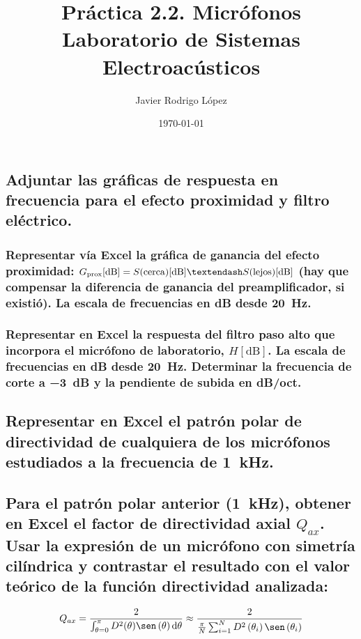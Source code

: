 \documentclass[10pt]{article}
\title{\Huge Práctica 2.2. Micrófonos \\\huge Laboratorio de Sistemas Electroacústicos}
\author{Javier Rodrigo López}
\date{\today}
\begin{document}
\maketitle
\setcounter{subsection}{3}

\subsection{Adjuntar las gráficas de respuesta en frecuencia para el efecto proximidad y filtro eléctrico.}
\subsubsection{Representar vía Excel la gráfica de ganancia del efecto proximidad: $G _{\textnormal{prox}} [\unit{\dB} ] = S(\text{cerca}) [\unit{\dB} ]  – S(\text{lejos}) [\unit{\dB} ] $ (hay que compensar la diferencia de ganancia del preamplificador, si existió). La escala de frecuencias en \unit{\dB} desde \qty{20}{\hertz }.}
\subsubsection{Representar en Excel la respuesta del filtro paso alto que incorpora el micrófono de laboratorio, $H [\unit{\dB} ] $. La escala de frecuencias en \unit{\dB} desde \qty{20}{\hertz }. Determinar la frecuencia de corte a \qty{-3}{\dB} y la pendiente de subida en dB/oct.}

\subsection{Representar en Excel el patrón polar de directividad de cualquiera de los micrófonos estudiados a la frecuencia de \qty{1}{\kilo \hertz }.}

\subsection{Para el patrón polar anterior (\qty{1}{\kilo \hertz }), obtener en Excel el factor de directividad axial $Q_{ax}$. Usar la expresión de un micrófono con simetría cilíndrica y contrastar el resultado con el valor teórico de la función directividad analizada:}

\begin{equation} \label{eq:qaxial}
  Q_{ax} = \frac{2}{\int_{\theta = 0}^{\pi } D^2 (\theta ) \sen \left( \theta  \right) \dd \theta } \approx \frac{2}{\frac{\pi }{N}\sum_{i=1}^{N}D^2 \left( \theta _i \right)\sen \left( \theta _i \right)}
\end{equation}
\end{document}
